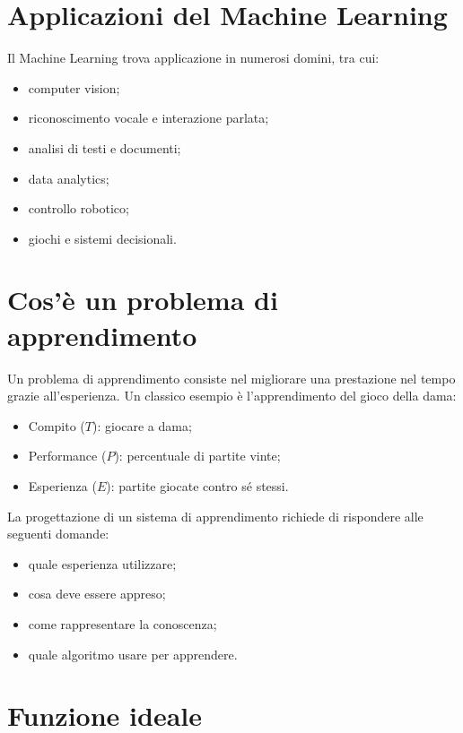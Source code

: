 \documentclass[a4paper,12pt]{report}
\begin{document}
\section{Applicazioni del Machine Learning}

Il Machine Learning trova applicazione in numerosi domini, tra cui:
\begin{itemize}
    \item computer vision;
    \item riconoscimento vocale e interazione parlata;
    \item analisi di testi e documenti;
    \item data analytics;
    \item controllo robotico;
    \item giochi e sistemi decisionali.
\end{itemize}

\section{Cos’è un problema di apprendimento}

Un problema di apprendimento consiste nel migliorare una prestazione nel tempo grazie all’esperienza.
Un classico esempio è l’apprendimento del gioco della dama:

\begin{itemize}
    \item Compito ($T$): giocare a dama;
    \item Performance ($P$): percentuale di partite vinte;
    \item Esperienza ($E$): partite giocate contro sé stessi.
\end{itemize}

La progettazione di un sistema di apprendimento richiede di rispondere alle seguenti domande:
\begin{itemize}
    \item quale esperienza utilizzare;
    \item cosa deve essere appreso;
    \item come rappresentare la conoscenza;
    \item quale algoritmo usare per apprendere.
\end{itemize}

\section{Funzione ideale}
\end{document}
